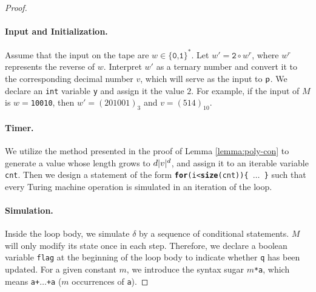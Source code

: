 \documentclass[runningheads]{llncs}
\begin{document}
\begin{proof}
\paragraph{Input and Initialization.} Assume that the input on the tape are $w\in\{\texttt{0,1}\}^{*}$.
Let $w'=\texttt{2}\circ w^r$, where $w^r$ represents the reverse of $w$.
Interpret $w'$ as a ternary number and convert it to the corresponding decimal number $v$, which will serve as the input to $\mathsf{p}$.
We declare an \texttt{int} variable \texttt{y} and assign it the value $2$.
For example, if the input of $M$ is $w=$\texttt{10010}, then $w'=(201001)_3$ and $v=(514)_{10}$.

\paragraph{Timer.} We utilize the method presented in the proof of Lemma \ref{lemma:poly-con} to generate a value whose length grows to $d\vert v\vert^d$, and assign it to an iterable variable \texttt{cnt}.
Then we design a statement of the form \texttt{\textbf{for}(i<\textbf{size}(cnt))\{ $\dots$ \}} such that every Turing machine operation is simulated in an iteration of the loop.

\paragraph{Simulation.} Inside the loop body, we simulate $\delta$ by a sequence of conditional statements.
$M$ will only modify its state once in each step.
Therefore, we declare a boolean variable \texttt{flag} at the beginning of the loop body to indicate whether \texttt{q} has been updated.
For a given constant $m$, we introduce the syntax sugar \texttt{$m$*a}, which means \texttt{a+$\dots$+a} ($m$ occurrences of \texttt{a}).


\end{proof}
\end{document}
